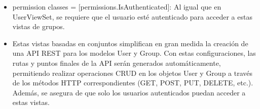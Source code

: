 \documentclass{article}
\begin{document}
\begin{itemize}
\item permission classes = [permissions.IsAuthenticated]: Al igual que en UserViewSet, se requiere que el usuario esté autenticado para acceder a estas vistas de grupos.

\item Estas vistas basadas en conjuntos simplifican en gran medida la creación de una API REST para los modelos User y Group. Con estas configuraciones, las rutas y puntos finales de la API serán generados automáticamente, permitiendo realizar operaciones CRUD en los objetos User y Group a través de los métodos HTTP correspondientes (GET, POST, PUT, DELETE, etc.). Además, se asegura de que solo los usuarios autenticados puedan acceder a estas vistas.

	
\end{itemize}	
	
\end{document}
